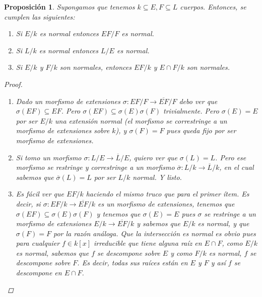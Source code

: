 \documentclass[12pt]{book}
\newtheorem{prop}[teo]{Proposición}
\theoremstyle{definition}
\begin{document}
\begin{prop}
Supongamos que tenemos $k\subseteq E,F \subseteq L$ cuerpos. Entonces, se cumplen las siguientes:
\begin{enumerate}
\item Si $E/k$ es normal entonces $EF/F$ es normal.
\item Si $L/k$ es normal entonces $L/E$ es normal.
\item Si $E/k$ y $F/k$ son normales, entonces $EF/k$ y $E\cap F/k$ son normales.
\end{enumerate}
\begin{proof}
\begin{enumerate}

\item Dado un morfismo de extensiones $\sigma:EF/F\to \overline{EF}/F$ debo ver que $\sigma(EF)\subseteq EF$. Pero $\sigma(EF)\subseteq \sigma(E)\sigma(F)$ trivialmente. Pero $\sigma(E)=E$ por ser $E/k$ una extensión normal (el morfismo se correstringe a un morfismo de extensiones sobre $k$), y $\sigma(F)=F$ pues queda fijo por ser morfismo de extensiones.

\item Si tomo un morfismo $\sigma:L/E \to \overline{L}/E$, quiero ver que $\sigma(L)=L$. Pero ese morfismo se restringe y correstringe a un morfismo $\overline{\sigma}: L/k \to \overline{L}/k$, en el cual sabemos que $\overline{\sigma}(L) = L$ por ser $L/k$ normal. Y listo.

\item Es fácil ver que $EF/k$ haciendo el mismo truco que para el primer ítem. Es decir, si $\sigma: EF/k\to \overline{EF}/k$ es un morfismo de extensiones, tenemos que $\sigma(EF)\subseteq\sigma(E)\sigma(F)$ y tenemos que $\sigma(E)=E$ pues $\sigma$ se restringe a un morfismo de extensiones $E/k\to\overline{EF}/k$ y sabemos que $E/k$ es normal, y que $\sigma(F)=F$ por la razón análoga. Que la intersección es normal es obvio pues para cualquier $f\in k[x]$ irreducible que tiene alguna raíz en $E\cap F$, como $E/k$ es normal, sabemos que $f$ se descompone sobre $E$ y como $F/k$ es normal, $f$ se descompone sobre $F$. Es decir, todas sus raíces están en $E$ y $F$ y así $f$ se descompone en $E\cap F$.

\end{enumerate}
\end{proof}
\end{prop}
\end{document}
